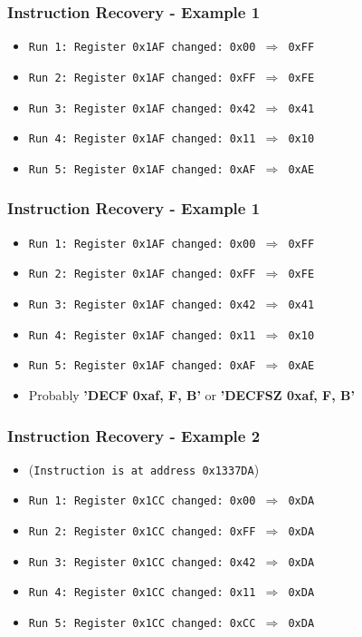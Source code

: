 \documentclass[aspectratio=169]{beamer}
\begin{document}
\begin{frame}
	\frametitle{Instruction Recovery - Example 1}

	\begin{itemize}
		\item \texttt{Run 1: Register 0x1AF changed: 0x00 $\Rightarrow$ 0xFF}
		\item \texttt{Run 2: Register 0x1AF changed: 0xFF $\Rightarrow$ 0xFE}
		\item \texttt{Run 3: Register 0x1AF changed: 0x42 $\Rightarrow$ 0x41}
		\item \texttt{Run 4: Register 0x1AF changed: 0x11 $\Rightarrow$ 0x10}
		\item \texttt{Run 5: Register 0x1AF changed: 0xAF $\Rightarrow$ 0xAE}
	\end{itemize}
\end{frame}

\begin{frame}
	\frametitle{Instruction Recovery - Example 1}

	\begin{itemize}
		\item \texttt{Run 1: Register 0x1AF changed: 0x00 $\Rightarrow$ 0xFF}
		\item \texttt{Run 2: Register 0x1AF changed: 0xFF $\Rightarrow$ 0xFE}
		\item \texttt{Run 3: Register 0x1AF changed: 0x42 $\Rightarrow$ 0x41}
		\item \texttt{Run 4: Register 0x1AF changed: 0x11 $\Rightarrow$ 0x10}
		\item \texttt{Run 5: Register 0x1AF changed: 0xAF $\Rightarrow$ 0xAE}
		\item Probably \textbf{'DECF 0xaf, F, B'} or \textbf{'DECFSZ 0xaf, F, B'}
	\end{itemize}
\end{frame}


\begin{frame}
	\frametitle{Instruction Recovery - Example 2}

	\begin{itemize}
		\item (\texttt{Instruction is at address 0x1337DA})
		\item \texttt{Run 1: Register 0x1CC changed: 0x00 $\Rightarrow$ 0xDA}
		\item \texttt{Run 2: Register 0x1CC changed: 0xFF $\Rightarrow$ 0xDA}
		\item \texttt{Run 3: Register 0x1CC changed: 0x42 $\Rightarrow$ 0xDA}
		\item \texttt{Run 4: Register 0x1CC changed: 0x11 $\Rightarrow$ 0xDA}
		\item \texttt{Run 5: Register 0x1CC changed: 0xCC $\Rightarrow$ 0xDA}
	\end{itemize}
\end{frame}
\end{document}
